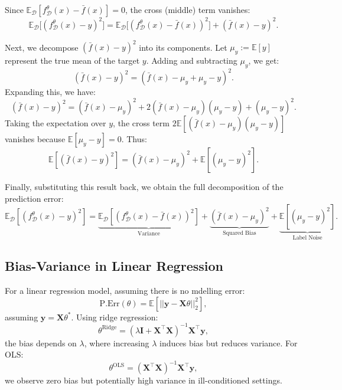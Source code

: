Since \( \mathbb{E}_{\mathcal{D}}[f_{\mathcal{D}}^\theta(x) - \bar{f}(x)] = 0 \), the cross (middle) term vanishes:
\[
    \mathbb{E}_{\mathcal{D}} \big[ (f_{\mathcal{D}}^\theta(x) - y)^2 \big] = \mathbb{E}_{\mathcal{D}} \big[ (f_{\mathcal{D}}^\theta(x) - \bar{f}(x))^2 \big] + (\bar{f}(x) - y)^2.
\]

Next, we decompose \( (\bar{f}(x) - y)^2 \) into its components. Let \( \mu_y := \mathbb{E}[y] \) represent the true mean of the target \( y \). Adding and subtracting \( \mu_y \), we get:
\[
    (\bar{f}(x) - y)^2 = (\bar{f}(x) - \mu_y + \mu_y - y)^2.
\]
Expanding this, we have:
\[
    (\bar{f}(x) - y)^2 = (\bar{f}(x) - \mu_y)^2 + 2 (\bar{f}(x) - \mu_y)(\mu_y - y) + (\mu_y - y)^2.
\]
Taking the expectation over \( y \), the cross term \( 2 \mathbb{E}[(\bar{f}(x) - \mu_y)(\mu_y - y)] \) vanishes because \( \mathbb{E}[\mu_y - y] = 0 \). Thus:
\[
    \mathbb{E}[(\bar{f}(x) - y)^2] = (\bar{f}(x) - \mu_y)^2 + \mathbb{E}[(\mu_y - y)^2].
\]

Finally, substituting this result back, we obtain the full decomposition of the prediction error:
\[
    \mathbb{E}_{\mathcal{D}}[(f_{\mathcal{D}}^\theta(x) - y)^2] = \underbrace{\mathbb{E}_{\mathcal{D}}[(f_{\mathcal{D}}^\theta(x) - \bar{f}(x))^2]}_{\text{Variance}} + \underbrace{(\bar{f}(x) - \mu_y)^2}_{\text{Squared Bias}} + \underbrace{\mathbb{E}[(\mu_y - y)^2]}_{\text{Label Noise}}.
\]



\subsection{Bias-Variance in Linear Regression}
For a linear regression model, assuming there is no mdelling error:
\[
    \mathrm{P.Err}(\theta) = \mathbb{E}[||\mathbf{y} - \mathbf{X}\theta||_2^2],
\]
assuming $\mathbf{y} = \mathbf{X}\theta^*$. Using ridge regression:
\[
    \theta^{\text{Ridge}} = (\lambda \mathbf{I} + \mathbf{X}^\top \mathbf{X})^{-1} \mathbf{X}^\top \mathbf{y},
\]
the bias depends on $\lambda$, where increasing $\lambda$ induces bias but reduces variance. For OLS:
\[
    \theta^{\text{OLS}} = (\mathbf{X}^\top \mathbf{X})^{-1} \mathbf{X}^\top \mathbf{y},
\]
we observe zero bias but potentially high variance in ill-conditioned settings.

